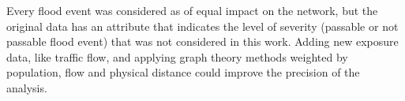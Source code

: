 \documentclass{pssbmac}
\begin{document}
Every flood event was considered as of equal impact on the network, but the original data has an attribute that indicates the level of severity (passable or not passable flood event) that was not considered in this work. Adding new exposure data, like traffic flow, and applying graph theory methods weighted by population, flow and physical distance could improve the precision of the analysis.


\printbibliography
\end{document}
